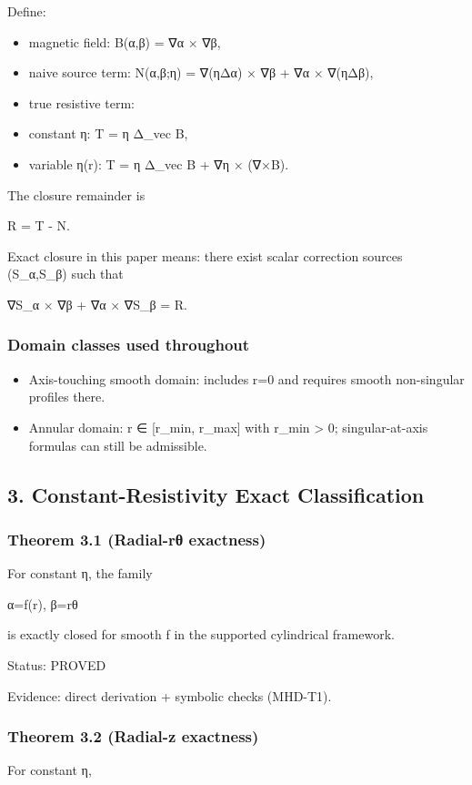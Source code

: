 \documentclass[11pt]{article}
\begin{document}
Define:

\begin{itemize}
\item magnetic field: B(α,β) = ∇α × ∇β,
\item naive source term: N(α,β;η) = ∇(ηΔα) × ∇β + ∇α × ∇(ηΔβ),
\item true resistive term:
\item constant η: T = η Δ\_vec B,
\item variable η(r): T = η Δ\_vec B + ∇η × (∇×B).
\end{itemize}

The closure remainder is


R = T - N.


Exact closure in this paper means: there exist scalar correction sources (S\_α,S\_β) such that


∇S\_α × ∇β + ∇α × ∇S\_β = R.


\subsubsection*{Domain classes used throughout}
\begin{itemize}
\item Axis-touching smooth domain: includes r=0 and requires smooth non-singular profiles there.
\item Annular domain: r ∈ [r\_min, r\_max] with r\_min > 0; singular-at-axis formulas can still be admissible.
\end{itemize}

\subsection*{3. Constant-Resistivity Exact Classification}

\subsubsection*{Theorem 3.1 (Radial-rθ exactness)}
For constant η, the family

α=f(r), β=rθ

is exactly closed for smooth f in the supported cylindrical framework.


Status: PROVED

Evidence: direct derivation + symbolic checks (MHD-T1).


\subsubsection*{Theorem 3.2 (Radial-z exactness)}
For constant η,
\end{document}
